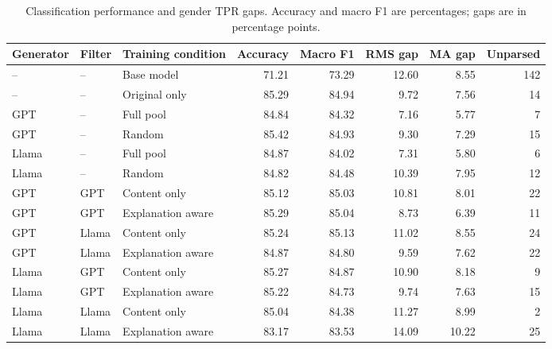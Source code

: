 \begin{table}[t]
\centering
\small
\caption{Classification performance and gender TPR gaps. Accuracy and macro F1 are percentages; gaps are in percentage points.}
\label{tab:downstream-all}
\begin{tabular}{lllrrrrr}
\toprule
Generator & Filter & Training condition & Accuracy & Macro F1 & RMS gap & MA gap & Unparsed \\
\midrule
-- & -- & Base model & 71.21 & 73.29 & 12.60 & 8.55 & 142 \\
-- & -- & Original only & 85.29 & 84.94 & 9.72 & 7.56 & 14 \\
\midrule
GPT & -- & Full pool & 84.84 & 84.32 & 7.16 & 5.77 & 7 \\
GPT & -- & Random & 85.42 & 84.93 & 9.30 & 7.29 & 15 \\
Llama & -- & Full pool & 84.87 & 84.02 & 7.31 & 5.80 & 6 \\
Llama & -- & Random & 84.82 & 84.48 & 10.39 & 7.95 & 12 \\
\midrule
GPT & GPT & Content only & 85.12 & 85.03 & 10.81 & 8.01 & 22 \\
GPT & GPT & Explanation aware & 85.29 & 85.04 & 8.73 & 6.39 & 11 \\
GPT & Llama & Content only & 85.24 & 85.13 & 11.02 & 8.55 & 24 \\
GPT & Llama & Explanation aware & 84.87 & 84.80 & 9.59 & 7.62 & 22 \\
Llama & GPT & Content only & 85.27 & 84.87 & 10.90 & 8.18 & 9 \\
Llama & GPT & Explanation aware & 85.22 & 84.73 & 9.74 & 7.63 & 15 \\
Llama & Llama & Content only & 85.04 & 84.38 & 11.27 & 8.99 & 2 \\
Llama & Llama & Explanation aware & 83.17 & 83.53 & 14.09 & 10.22 & 25 \\
\bottomrule
\end{tabular}
\end{table}
